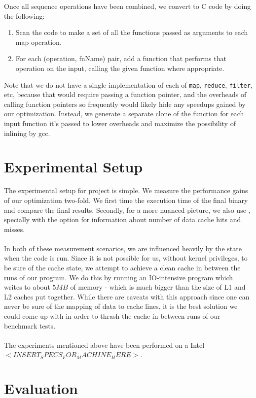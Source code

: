 \documentclass[a4paper,twocolumn]{article}
\newcommand{\sml}[1]{\texttt{#1}}
\begin{document}
\noindent
Once all sequence operations have been combined, we convert to C code by doing
the following:
\begin{enumerate}
\item Scan the code to make a set of all the functions passed as arguments to
  each map operation.
\item For each (operation, fnName) pair, add a function that performs that
  operation on the input, calling the given function where appropriate.
\end{enumerate}
\noindent
Note that we do not have a single implementation of each of \sml{map},
\sml{reduce}, \sml{filter}, etc, because that would require passing a function
pointer, and the overheads of calling function pointers so frequently would
likely hide any speedups gained by our optimization. Instead, we generate a
separate clone of the function for each input function it's passed to lower
overheads and maximize the possibility of inlining by gcc.




\section{Experimental Setup}
The experimental setup for project is simple. We measure the performance gains
of our optimization two-fold. We first time the execution time of the final
binary and compare the final results. Secondly, for a more nuanced picture, we
also use , specially with the  option for
information about number of data cache hits and misses.
\\
\\In both of these measurement scenarios, we are influenced heavily by the
state when the code is run. Since it is not possible for us, without kernel
privileges, to be sure of the cache state, we attempt to achieve a clean cache
in between the runs of our program. We do this by running an IO-intensive
program which writes to about $5MB$ of memory - which is much bigger than the
size of L1 and L2 caches put together. While there are caveats with this approach
since one can never be sure of the mapping of data to cache lines, it is the
best solution we could come up with in order to thrash the cache in between
runs of our benchmark tests.
\\
\\ The experiments mentioned above have been performed on a Intel
$<INSERT_SPECS_FOR_MACHINE_HERE>$.
\section{Evaluation}
\end{document}
